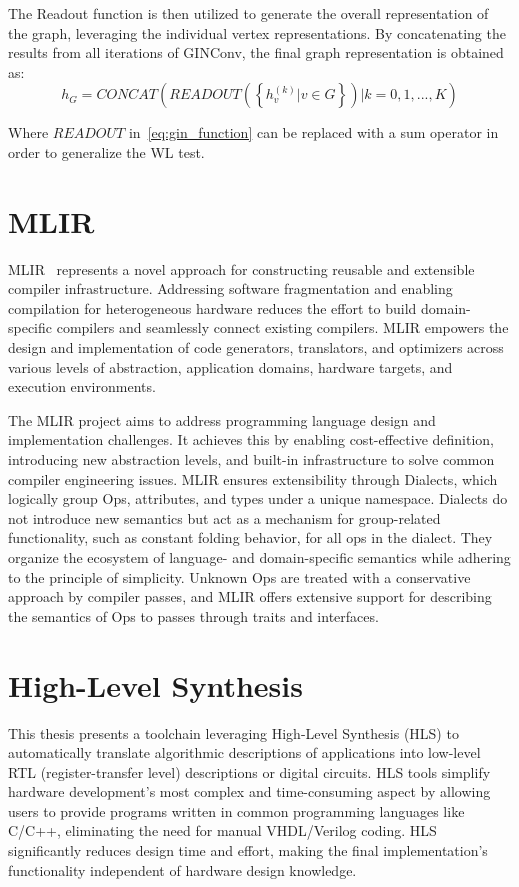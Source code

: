 The Readout function is then utilized to generate the overall representation of the graph, leveraging the individual vertex representations.
By concatenating the results from all iterations of GINConv, the final graph representation is obtained as:
\begin{equation}
    \label{eq:gin_readout}
    h_G = CONCAT \left( READOUT \left( \left\{ h_v^{(k)} | v \in G \right\} \right) | k = 0, 1, ..., K \right)
\end{equation}

Where $READOUT$ in~\ref{eq:gin_function} can be replaced with a sum operator in order to generalize the WL test.

\section{MLIR}
\label{sec:mlir}%
MLIR~\cite{9370308} represents a novel approach for constructing reusable and extensible compiler infrastructure.
Addressing software fragmentation and enabling compilation for heterogeneous hardware reduces the effort to build domain-specific compilers and seamlessly connect existing compilers.
MLIR empowers the design and implementation of code generators, translators, and optimizers across various levels of abstraction, application domains, hardware targets, and execution environments.

The MLIR project aims to address programming language design and implementation challenges.
It achieves this by enabling cost-effective definition, introducing new abstraction levels, and built-in infrastructure to solve common compiler engineering issues.
MLIR ensures extensibility through Dialects, which logically group Ops, attributes, and types under a unique namespace.
Dialects do not introduce new semantics but act as a mechanism for group-related functionality, such as constant folding behavior, for all ops in the dialect.
They organize the ecosystem of language- and domain-specific semantics while adhering to the principle of simplicity.
Unknown Ops are treated with a conservative approach by compiler passes, and MLIR offers extensive support for describing the semantics of Ops to passes through traits and interfaces.

\section{High-Level Synthesis}
\label{sec:hls}%

This thesis presents a toolchain leveraging High-Level Synthesis (HLS) to automatically translate algorithmic descriptions of applications into low-level RTL (register-transfer level) descriptions or digital circuits.
HLS tools simplify hardware development's most complex and time-consuming aspect by allowing users to provide programs written in common programming languages like C/C++, eliminating the need for manual VHDL/Verilog coding.
HLS significantly reduces design time and effort, making the final implementation's functionality independent of hardware design knowledge.

